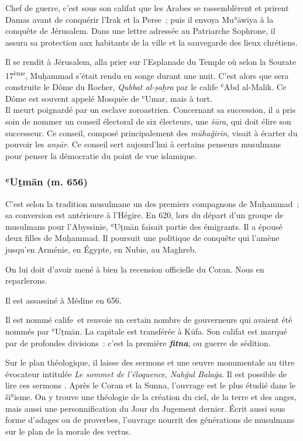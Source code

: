 Chef de guerre, c'est sous son califat que les Arabes se rassemblèrent
et prirent Damas avant de conquérir l'Irak et la Perse~; puis il envoya
Muʾāwiya à la conquête de Jérusalem. Dans une lettre adressée au
Patriarche Sophrone, il assura sa protection aux habitants de la ville
et la sauvegarde des lieux chrétiens.

Il se rendit à Jérusalem, alla prier sur l'Esplanade du Temple où selon
la Sourate 17\textsuperscript{ème}, Muḥammad s'était rendu en songe
durant une nuit. C'est alors que sera construite le Dôme du Rocher,
\emph{Qubbat al-ṣaḫra} par le calife ʿAbd al-Malik. Ce Dôme est souvent
appelé Mosquée de ʿUmar, mais à tort. \\


Il meurt poignardé par un esclave zoroastrien. Concernant sa succession,
il a pris soin de nommer un conseil électoral de six électeurs, une
\emph{šūra}, qui doit élire son successeur. Ce conseil, composé
principalement des \emph{mūhaǧirīn}, visait à écarter du pouvoir les
\emph{anṣār}. Ce conseil sert aujourd'hui à certains penseurs musulmans
pour penser la démocratie du point de vue islamique.

 
\subsubsection{ʿUṯmān (m. 656)
} 
C'est selon la tradition musulmane un des premiers compagnons de
Muḥammad~; sa conversion est antérieure à l'Hégire. En 620, lors du
départ d'un groupe de musulmans pour l'Abyssinie, ʿUṯmān faisait partie
des émigrants. Il a épousé deux filles de Muḥammad. Il poursuit une
politique de conquête qui l'amène jusqu'en Arménie, en Égypte, en Nubie,
au Maghreb.

On lui doit d'avoir mené à bien la recension officielle du Coran. Nous
en reparlerons.

Il est assassiné à Médine en 656.


Il est nommé calife~et renvoie un certain nombre de gouverneurs qui
avaient été nommés par ʿUṯmān. La capitale est transférée à Kūfa. Son
califat est marqué par de profondes divisions~: c'est la première
\emph{\textbf{fitna}}, ou guerre de sédition.

Sur le plan théologique, il laisse des sermons et une œuvre monumentale
au titre évocateur intitulée \emph{Le sommet de l'éloquence},
\emph{Nahǧul Balaġa}. Il est possible de lire ces sermons
. Après le Coran et la Sunna, l'ouvrage est le plus étudié dans
le šīʿisme. On y trouve une théologie de la création du ciel, de la
terre et des anges, mais aussi une personnification du Jour du Jugement
dernier. Écrit aussi sous forme d'adages ou de proverbes, l'ouvrage
nourrit des générations de musulmans sur le plan de la morale des
vertus.

